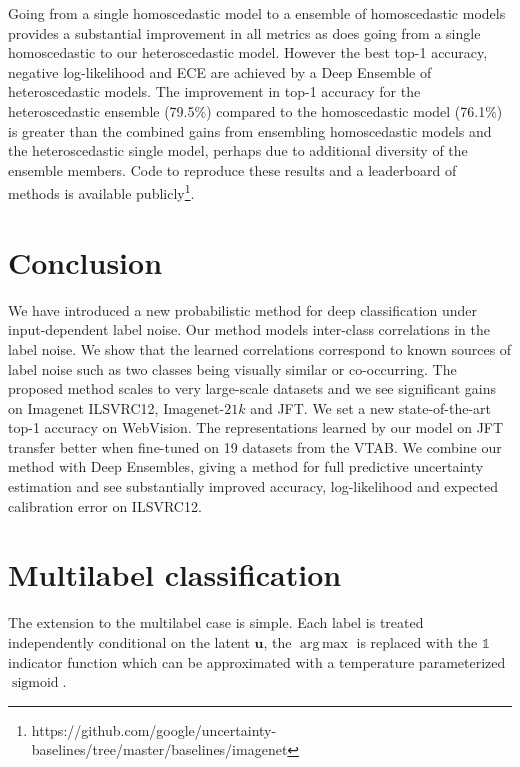 \documentclass[final]{cvpr}
\DeclareMathOperator*{\argmax}{arg\,max}
\DeclareMathOperator*{\sigmoid}{sigmoid}
\begin{document}
Going from a single homoscedastic model to a ensemble of homoscedastic models provides a substantial improvement in all metrics as does going from a single homoscedastic to our heteroscedastic model. However the best top-1 accuracy, negative log-likelihood and ECE are achieved by a Deep Ensemble of heteroscedastic models. The improvement in top-1 accuracy for the heteroscedastic ensemble (79.5\%) compared to the homoscedastic model (76.1\%) is greater than the combined gains from ensembling homoscedastic models and the heteroscedastic single model, perhaps due to additional diversity of the ensemble members. Code to reproduce these results and a leaderboard of methods is available publicly\footnote{https://github.com/google/uncertainty-baselines/tree/master/baselines/imagenet}.

\section{Conclusion}

We have introduced a new probabilistic method for deep classification under input-dependent label noise. Our method models inter-class correlations in the label noise. We show that the learned correlations correspond to known sources of label noise such as two classes being visually similar or co-occurring. The proposed method scales to very large-scale datasets and we see significant gains on Imagenet ILSVRC12, Imagenet-$21k$ and JFT. We set a new state-of-the-art top-1 accuracy on WebVision. The representations learned by our model on JFT transfer better when fine-tuned on 19 datasets from the VTAB. We combine our method with Deep Ensembles, giving a method for full predictive uncertainty estimation and see substantially improved accuracy, log-likelihood and expected calibration error on ILSVRC12.


\clearpage


{\small

}

\clearpage
\appendix

\section{Multilabel classification}
\label{app:multilabel_classification}

The extension to the multilabel case is simple. Each label is treated independently conditional on the latent $\mathbf{u}$, the $\argmax$ is replaced with the $\mathds{1}$ indicator function which can be approximated with a temperature parameterized $\sigmoid$.
\end{document}
